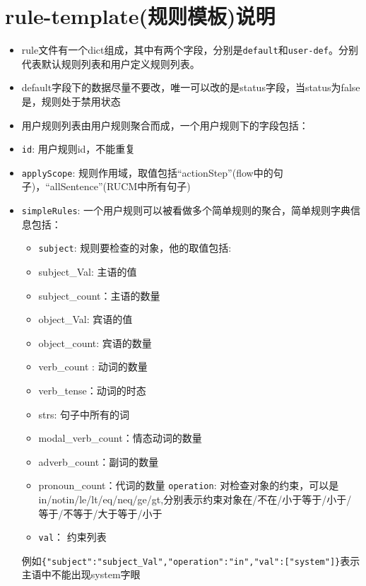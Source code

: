 \chapter{rule-template(规则模板)说明}
\begin{itemize}
    \item
    rule文件有一个dict组成，其中有两个字段，分别是\texttt{default}和\texttt{user-def}。分别代表默认规则列表和用户定义规则列表。
    \item
    default字段下的数据尽量不要改，唯一可以改的是status字段，当status为false是，规则处于禁用状态
    \item
    用户规则列表由用户规则聚合而成，一个用户规则下的字段包括：
    \item
    \texttt{id}: 用户规则id，不能重复
    \item
    \texttt{applyScope}:
    规则作用域，取值包括``actionStep''(flow中的句子)，``allSentence''(RUCM中所有句子)
    
    \item
    \texttt{simpleRules}:
    一个用户规则可以被看做多个简单规则的聚合，简单规则字典信息包括：
        \begin{itemize}
        \item
            \texttt{subject}: 规则要检查的对象，他的取值包括:
        \item
            subject\_Val: 主语的值
        \item
            subject\_count：主语的数量
        \item
            object\_Val: 宾语的值
        \item
            object\_count: 宾语的数量
        \item
            verb\_count : 动词的数量
        \item
            verb\_tense：动词的时态
        \item
            strs: 句子中所有的词
        \item
            modal\_verb\_count：情态动词的数量
        \item
            adverb\_count：副词的数量
        \item
            pronoun\_count：代词的数量
            \texttt{operation}:
            对检查对象的约束，可以是in/notin/le/lt/eq/neq/ge/gt,分别表示约束对象在/不在/小于等于/小于/等于/不等于/大于等于/小于
        \item
            \texttt{val}： 约束列表
        \end{itemize}
            例如\texttt{\{"subject":"subject\_Val","operation":"in","val":{[}"system"{]}\}}表示主语中不能出现system字眼
            

\end{itemize}
